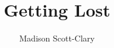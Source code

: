 \documentclass[12pt,letterpaper,oneside]{memoir}
\title{Getting Lost}
\author{Madison Scott-Clary}
\begin{document}
  \maketitle

  \newpage

  \tableofcontents

  \part{}

  
  
  
  
  

  \part{}

  
  
  
  
  
  
  
  
  
  
  
  

  \part{}
\end{document}
